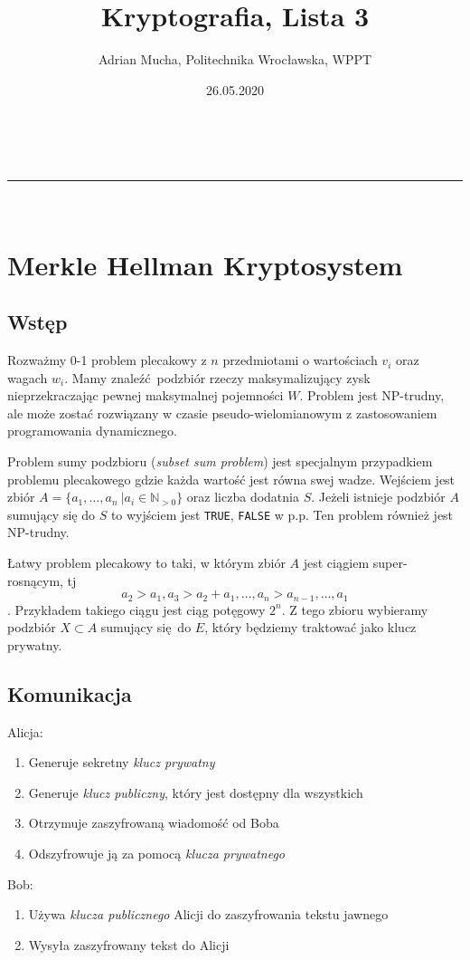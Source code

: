 \documentclass[a4paper,11pt]{article}
\makeatletter
\newcommand{\linia}{\rule{\linewidth}{0.5pt}}
\theoremstyle{mytheor}
\renewcommand{\maketitle}{
\begin{center}
\vspace{2ex}
{\huge \textsc{\@title}}
\vspace{1ex}
\\
\linia\\
\@author \hfill \@date
\vspace{4ex}
\end{center}
}
\makeatother
\begin{document}
\title{Kryptografia, Lista 3}

\author{Adrian Mucha, Politechnika Wrocławska, WPPT}

\date{26.05.2020}

\maketitle

\section*{Merkle Hellman Kryptosystem}
\subsection*{Wstęp}
Rozważmy 0-1 problem plecakowy z $n$ przedmiotami o wartościach $v_i$ oraz wagach $w_i$. Mamy znaleźć podzbiór rzeczy maksymalizujący zysk nieprzekraczając pewnej maksymalnej pojemności $W$. Problem jest NP-trudny, ale może zostać rozwiązany w czasie pseudo-wielomianowym z zastosowaniem programowania dynamicznego.

Problem sumy podzbioru (\textit{subset sum problem}) jest specjalnym przypadkiem problemu plecakowego gdzie każda wartość jest równa swej wadze. Wejściem jest zbiór $A = \{a_1,\ldots,a_n\ | a_i\in \mathbb{N}_{>0} \}$ oraz liczba dodatnia $S$. Jeżeli istnieje podzbiór $A$ sumujący się do $S$ to wyjściem jest \texttt{TRUE}, \texttt{FALSE} w p.p. Ten problem również jest NP-trudny.

Łatwy problem plecakowy to taki, w którym zbiór $A$ jest ciągiem super-rosnącym, tj $$ a_2 > a_1, a_3 > a_2 + a_1,\ldots, a_n > a_{n-1},\ldots, a_1 $$. Przykładem takiego ciągu jest ciąg potęgowy $2^n$. Z tego zbioru wybieramy podzbiór $X\subset A$ sumujący się do $E$, który będziemy traktować jako klucz prywatny.

\subsection*{Komunikacja}
Alicja:
\begin{enumerate}
    \item Generuje sekretny \textit{klucz prywatny}
    \item Generuje \textit{klucz publiczny}, który jest dostępny dla wszystkich
    \item Otrzymuje zaszyfrowaną wiadomość od Boba
    \item Odszyfrowuje ją za pomocą \textit{klucza prywatnego}
\end{enumerate}
Bob:
\begin{enumerate}
    \item Używa \textit{klucza publicznego} Alicji do zaszyfrowania tekstu jawnego
    \item Wysyła zaszyfrowany tekst do Alicji
\end{enumerate}
\end{document}
